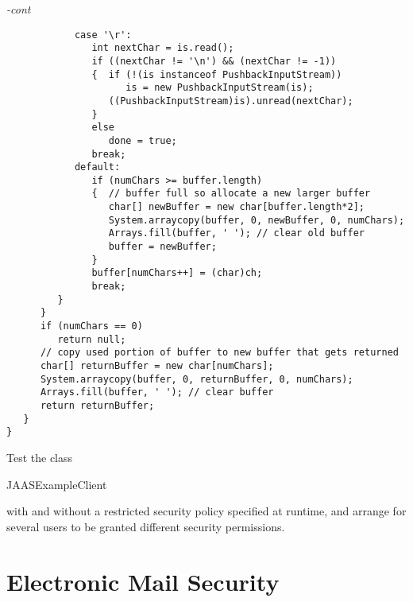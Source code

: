 \begin{figure*}\begin{program}\emph{-cont}\begin{verbatim}
            case '\r':
               int nextChar = is.read();
               if ((nextChar != '\n') && (nextChar != -1))
               {  if (!(is instanceof PushbackInputStream))
                     is = new PushbackInputStream(is);
                  ((PushbackInputStream)is).unread(nextChar);
               }
               else
                  done = true;
               break;
            default:
               if (numChars >= buffer.length)
               {  // buffer full so allocate a new larger buffer
                  char[] newBuffer = new char[buffer.length*2];
                  System.arraycopy(buffer, 0, newBuffer, 0, numChars);
                  Arrays.fill(buffer, ' '); // clear old buffer
                  buffer = newBuffer;
               }
               buffer[numChars++] = (char)ch;
               break;
         }
      }
      if (numChars == 0)
         return null;
      // copy used portion of buffer to new buffer that gets returned
      char[] returnBuffer = new char[numChars];
      System.arraycopy(buffer, 0, returnBuffer, 0, numChars);
      Arrays.fill(buffer, ' '); // clear buffer
      return returnBuffer;
   }
}
\end{verbatim}\end{program}\end{figure*}


\begin{exercise}
  Test the class \begin{code}JAAS\-ExampleClient\end{code} with and
  without a restricted security policy specified at runtime,
  and arrange for several users to be granted different security permissions.
\end{exercise}



\section{Electronic Mail Security}


